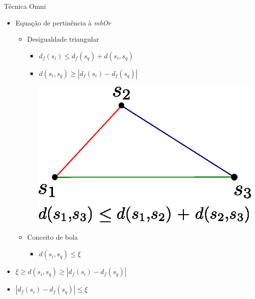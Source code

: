 \documentclass{beamer}
\begin{document}
\begin{frame}{Técnica Omni}	
	\begin{itemize}
	 \item Equação de pertinência à \textit{mbOr}\newline
	    \begin{itemize}
	      \item Desigualdade triangular\newline
		\begin{itemize}
		  \item $d_{f}(s_i) \leq d_{f}(s_q) + d(s_i, s_q)$\newline
		  
		  \item $d(s_i, s_q) \geq |d_{f}(s_i) - d_{f}(s_q)|$\newline
		      \begin{floatingfigure}[!hr]{0.5\textwidth}
			\vspace{3cm}
			\hspace{6cm}
			\includegraphics[width=.35\textwidth]{desig_tri.eps}
		      \end{floatingfigure}
		\end{itemize}
	      \item Conceito de bola\newline
		\begin{itemize}
		  \item $d(s_i, s_q) \leq \xi$\newline
		\end{itemize}
	    \end{itemize}
	\item $\xi \geq d(s_i,s_q) \geq |d_f(s_i) - d_f(s_q)|$\newline
	\item $|d_f(s_i) - d_f(s_q)| \leq \xi$
	\end{itemize}

\end{frame}
\end{document}
